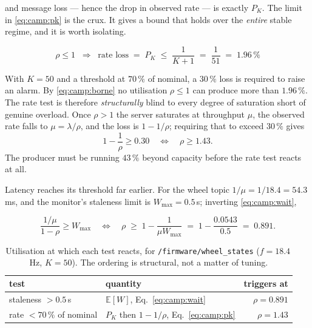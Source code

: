 and message loss --- hence the drop in observed rate --- is exactly $P_K$.
The limit in \eqref{eq:camp:pk} is the crux. It gives a bound that holds over
the \emph{entire} stable regime, and it is worth isolating.

\begin{equation}
  \boxed{\;
  \rho \le 1
  \;\;\Longrightarrow\;\;
  \text{rate loss} \;=\; P_K \;\le\; \frac{1}{K+1}
  \;=\; \frac{1}{51} \;=\; 1.96\,\% \;}
  \label{eq:camp:borne}
\end{equation}

\begin{tcolorbox}[colback=caseboxbg, colframe=accentblue!60,
                  title={Consequence: the rate alarm cannot fire while the
                         queue is stable}]
With $K=50$ and a threshold at $70\,\%$ of nominal, a $30\,\%$ loss is required
to raise an alarm. By \eqref{eq:camp:borne} no utilisation $\rho\le1$ can
produce more than $1.96\,\%$. The rate test is therefore \emph{structurally}
blind to every degree of saturation short of genuine overload. Once
$\rho>1$ the server saturates at throughput $\mu$, the observed rate falls to
$\mu = \lambda/\rho$, and the loss is $1-1/\rho$; requiring that to exceed
$30\,\%$ gives
\[
  1 - \frac{1}{\rho} \ge 0.30
  \quad\Longleftrightarrow\quad
  \rho \ge 1.43 .
\]
The producer must be running $43\,\%$ beyond capacity before the rate test
reacts at all.
\end{tcolorbox}

Latency reaches its threshold far earlier. For the wheel topic
$1/\mu = 1/18.4 = 54.3$\,ms, and the monitor's staleness limit is
$W_{\max} = 0.5$\,s; inverting \eqref{eq:camp:wait},

\begin{equation}
  \frac{1/\mu}{1-\rho} \ge W_{\max}
  \quad\Longleftrightarrow\quad
  \rho \;\ge\; 1 - \frac{1}{\mu W_{\max}}
  \;=\; 1 - \frac{0.0543}{0.5}
  \;=\; 0.891 .
\end{equation}

\begin{table}[htbp]
\centering
\caption{Utilisation at which each test reacts, for
\texttt{/firmware/wheel\_states} ($f=18.4$\,Hz, $K=50$). The ordering is
structural, not a matter of tuning.}
\label{tab:camp:ordre}
\begin{tabular}{llr}
\toprule
test & quantity & triggers at \\
\midrule
staleness $>0.5$\,s        & $\mathbb{E}[W]$, Eq.~\eqref{eq:camp:wait} & $\rho = 0.891$ \\
rate $<70\,\%$ of nominal  & $P_K$ then $1-1/\rho$, Eq.~\eqref{eq:camp:pk} & $\rho = 1.43$ \\
\bottomrule
\end{tabular}
\end{table}

